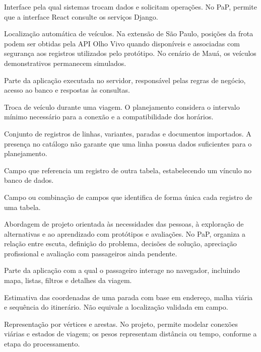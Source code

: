 \documentclass[12pt,oneside,a4paper,brazil,chapter=TITLE]{abntex2}
\begin{document}
\begin{description}[style=nextline,leftmargin=0pt,labelwidth=0pt,font=\bfseries,itemsep=0.5\baselineskip]
\item[API (Application Programming Interface)] Interface pela qual sistemas trocam dados e solicitam operações. No PaP, permite que a interface React consulte os serviços Django.
\item[AVL (Automatic Vehicle Location)] Localização automática de veículos. Na extensão de São Paulo, posições da frota podem ser obtidas pela API Olho Vivo quando disponíveis e associadas com segurança aos registros utilizados pelo protótipo. No cenário de Mauá, os veículos demonstrativos permanecem simulados.
\item[Backend] Parte da aplicação executada no servidor, responsável pelas regras de negócio, acesso ao banco e respostas às consultas.
\item[Baldeação] Troca de veículo durante uma viagem. O planejamento considera o intervalo mínimo necessário para a conexão e a compatibilidade dos horários.
\item[Catálogo] Conjunto de registros de linhas, variantes, paradas e documentos importados. A presença no catálogo não garante que uma linha possua dados suficientes para o planejamento.
\item[Chave estrangeira (FK, Foreign Key)] Campo que referencia um registro de outra tabela, estabelecendo um vínculo no banco de dados.
\item[Chave primária (PK, Primary Key)] Campo ou combinação de campos que identifica de forma única cada registro de uma tabela.
\item[Design Thinking] Abordagem de projeto orientada às necessidades das pessoas, à exploração de alternativas e ao aprendizado com protótipos e avaliações. No PaP, organiza a relação entre escuta, definição do problema, decisões de solução, apreciação profissional e avaliação com passageiros ainda pendente.
\item[Frontend] Parte da aplicação com a qual o passageiro interage no navegador, incluindo mapa, listas, filtros e detalhes da viagem.
\item[Geolocalização aproximada] Estimativa das coordenadas de uma parada com base em endereço, malha viária e sequência do itinerário. Não equivale a localização validada em campo.
\item[Grafo] Representação por vértices e arestas. No projeto, permite modelar conexões viárias e estados de viagem; os pesos representam distância ou tempo, conforme a etapa do processamento.

\end{description}
\end{document}

